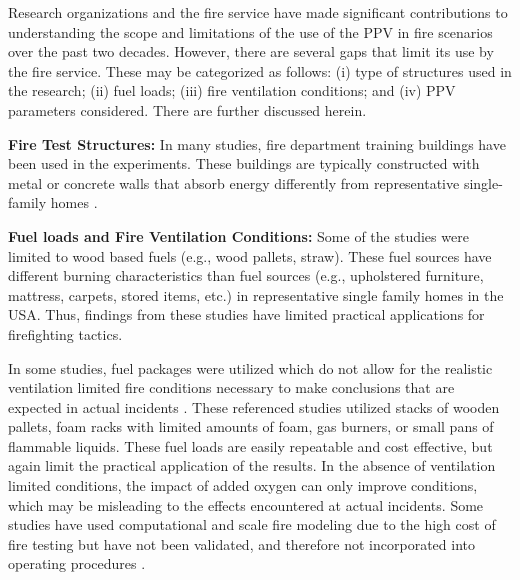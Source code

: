 \documentclass{article}
\begin{document}
Research organizations and the fire service have made significant contributions to understanding the scope and limitations of the use of the PPV in fire scenarios over the past two decades. However, there are several gaps that limit its use by the fire service. These may be categorized as follows: (i) type of structures used in the research; (ii) fuel loads; (iii) fire ventilation conditions; and (iv) PPV parameters considered. There are further discussed herein. \par

\textbf{Fire Test Structures:} In many studies, fire department training buildings have been used in the experiments. These buildings are typically constructed with metal or concrete walls that absorb energy differently from representative single-family homes \cite{HughesPPVTesting} \cite{KerberPPVinTraining} \cite{SvennsonFireVentilationDuringOperatoins}. 

\textbf{Fuel loads and Fire Ventilation Conditions:} Some of the studies were limited to wood based fuels (e.g., wood pallets, straw). These fuel sources have different burning characteristics than fuel sources (e.g., upholstered furniture, mattress, carpets, stored items, etc.) in representative single family homes in the USA. Thus, findings from these studies \cite{HughesPPVTesting} \cite{KerberPPVinTraining} \cite{SvennsonFireVentilationDuringOperatoins} have limited practical applications for firefighting tactics. \par

In some studies, fuel packages were utilized which do not allow for the realistic ventilation limited fire conditions necessary to make conclusions that are expected in actual incidents \cite{ExekoyePPVHouseFires} \cite{SvenssonFireVentinLargeFireHall} \cite{BowserTacticalVent} \cite{EzekoyePPVStrucuresReport}. These referenced studies utilized stacks of wooden pallets, foam racks with limited amounts of foam, gas burners, or small pans of flammable liquids. These fuel loads are easily repeatable and cost effective, but again limit the practical application of the results. In the absence of ventilation limited conditions, the impact of added oxygen can only improve conditions, which may be misleading to the effects encountered at actual incidents. Some studies have used computational and scale fire modeling due to the high cost of fire testing but have not been validated, and therefore not incorporated into operating procedures \cite{Didona1993modeling} \cite{KerberPPVCFD} \cite{KerberPPVFDS} \cite{TuomisaariVentilationInFirefighting}. \par
\end{document}
